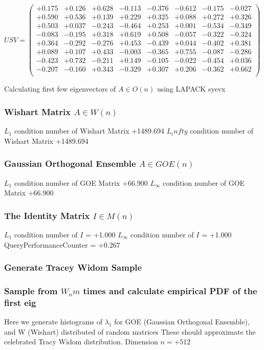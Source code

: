 \documentclass[9pt]{article}
\theoremstyle{plain}
\theoremstyle{definition}
\theoremstyle{remark}
\numberwithin{equation}{section}
\begin{document}
$U S V = \left(
\begin{array}{
cccccccc}
+0.175 & +0.126 & +0.628 & -0.113 & -0.376 & -0.612 & -0.175 & -0.027 \\
+0.590 & +0.536 & +0.139 & +0.229 & +0.325 & +0.088 & +0.272 & +0.326 \\
+0.503 & +0.037 & -0.243 & -0.464 & +0.253 & +0.001 & -0.534 & -0.349 \\
-0.083 & -0.195 & +0.318 & +0.619 & +0.508 & -0.057 & -0.322 & -0.324 \\
+0.364 & -0.292 & -0.276 & +0.453 & -0.439 & +0.044 & -0.402 & +0.381 \\
+0.089 & +0.107 & +0.433 & -0.003 & -0.365 & +0.755 & -0.087 & -0.286 \\
-0.423 & +0.732 & -0.211 & +0.149 & -0.105 & -0.022 & -0.454 & +0.036 \\
-0.207 & -0.160 & +0.343 & -0.329 & +0.307 & +0.206 & -0.362 & +0.662 \\
\end{array}
\right)$ \newline 

Calculating first few eigenvectors of $A \in O(n)$ using LAPACK syevx

\subsubsection{Wishart Matrix $A \in W(n)$}
$L_1$ condition number of Wishart Matrix +1489.694
$L_infty$ condition number of Wishart Matrix +1489.694
\subsubsection{Gaussian Orthogonal Ensemble $A \in GOE(n)$}
$L_1$ condition number of GOE Matrix +66.900
$L_\infty$ condition number of GOE Matrix +66.900
\subsubsection{The Identity Matrix $I \in M(n)$}
$L_1$ condition number of $I$ = +1.000
$L_\infty$ condition number of $I$ = +1.000
QueryPerformanceCounter  =  +0.267
\subsubsection{Generate Tracey Widom Sample}
\subsubsection{Sample from $W_n m$ times and calculate empirical PDF of the first eig}
Here we generate histograms of $\lambda_1$ for GOE (Gaussian Orthogonal Ensemble), and W (Wishart) 		 distributed of random matrices
These should approximate the celebrated Tracy Widom distribution.
Dimension $n = +512$
\end{document}
